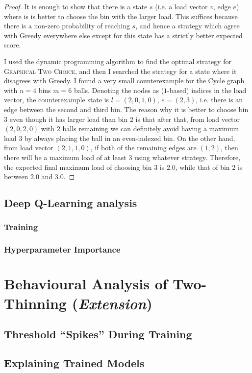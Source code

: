 \begin{proof}
It is enough to show that there is a state $s$ (i.e. a load vector $v$, edge $e$) where is is better to choose the bin with the larger load. This suffices because there is a non-zero probability of reaching $s$, and hence a strategy which agree with Greedy everywhere else except for this state has a strictly better expected score.


I used the dynamic programming algorithm to find the optimal strategy for \textsc{Graphical Two Choice}, and then I searched the strategy for a state where it disagrees with Greedy. I found a very small counterexample for the Cycle graph with $n=4$ bins $m=6$ balls. Denoting the nodes as ($1$-based) indices in the load vector, the counterexample state is $l=(2,0,1,0)$, $e=(2,3)$, i.e. there is an edge between the second and third bin. The reason why it is better to choose bin $3$ even though it has larger load than bin $2$ is that after that, from load vector $(2,0,2,0)$ with $2$ balls remaining we can definitely avoid having a maximum load $3$ by always placing the ball in an even-indexed bin. On the other hand, from load vector $(2,1,1,0)$, if both of the remaining edges are $(1,2)$, then there will be a maximum load of at least $3$ using whatever strategy. Therefore, the expected final maximum load of choosing bin $3$ is $2.0$, while that of bin $2$ is between $2.0$ and $3.0$.
\end{proof}

\subsection{Deep Q-Learning analysis}


\subsubsection{Training}


\subsubsection{Hyperparameter Importance}



\section{Behavioural Analysis of Two-Thinning (\textit{Extension})}


\subsection{Threshold ``Spikes'' During Training}


\subsection{Explaining Trained Models}